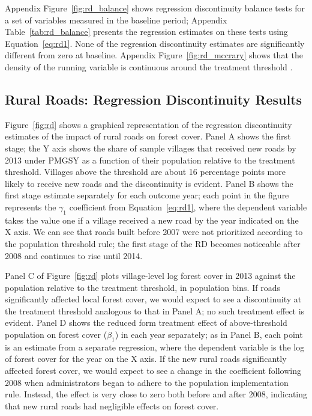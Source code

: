 Appendix Figure~\ref{fig:rd_balance} shows regression discontinuity
balance tests for a set of variables measured in the baseline period;
Appendix Table~\ref{tab:rd_balance} presents the regression estimates on these
tests using Equation~\ref{eq:rd1}. None of the regression
discontinuity estimates are significantly different from zero at
baseline. Appendix Figure~\ref{fig:rd_mccrary} shows that the density
of the running variable is continuous around the treatment threshold
\cite{MC08}.

\subsection{Rural Roads: Regression Discontinuity Results}

Figure~\ref{fig:rd} shows a graphical representation of the regression
discontinuity estimates of the impact of rural roads on forest
cover. Panel A shows the first stage; the Y axis shows the share of
sample villages that received new roads by 2013 under PMGSY as a
function of their population relative to the treatment
threshold. Villages above the threshold are about 16 percentage points more likely to
receive new roads and the discontinuity is evident. Panel B shows the
first stage estimate separately for each outcome year; each point in
the figure represents the $\gamma_1$ coefficient from
Equation~\ref{eq:rd1}, where the dependent variable takes the value
one if a village received a new road by the year indicated on the X
axis. We can see that roads built before 2007 were not prioritized
according to the population threshold rule; the first stage of the RD
becomes noticeable after 2008 and continues to rise until 2014.

Panel C of Figure~\ref{fig:rd} plots village-level log forest cover in
2013 against the population relative to the treatment threshold, in
population bins. If roads significantly affected local forest cover,
we would expect to see a discontinuity at the treatment threshold
analogous to that in Panel A; no such treatment effect is
evident. Panel D shows the reduced form treatment effect of
above-threshold population on forest cover ($\beta_1$) in each year
separately; as in Panel B, each point is an estimate from a separate
regression, where the dependent variable is the log of forest cover
for the year on the X axis. If the new rural roads significantly
affected forest cover, we would expect to see a change in the
coefficient following 2008 when administrators began to adhere to the
population implementation rule. Instead, the effect is very close to
zero both before and after 2008, indicating that new rural roads had
negligible effects on forest cover.

